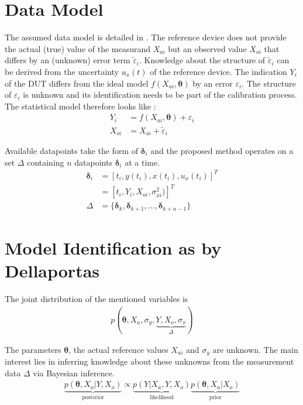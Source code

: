 \documentclass[10pt]{article}
\renewcommand{\vec}[1]{\boldsymbol{#1}}
\begin{document}
    \section{Data Model}
    The assumed data model is detailed in \cite{dellaportas_1995}.
    The reference device does not provide the actual (true) value of the measurand $X_{ai}$ but an observed value $X_{oi}$ that differs by an (unknown) error term $\tilde{\varepsilon}_i$.
    Knowledge about the structure of $\tilde{\varepsilon}_i$ can be derived from the uncertainty $u_x(t)$ of the reference device.
    The indication $Y_i$ of the DUT differs from the ideal model $f(X_{ai}, \vec{\theta})$ by an error $\varepsilon_i$.
    The structure of $\varepsilon_i$ is unknown and its identification needs to be part of the calibration process.
    The statistical model therefore looks like \cite{dellaportas_1995}:
    \begin{align}
        Y_i &= f(X_{ai}, \vec{\theta}) + \varepsilon_i \\
        X_{oi} &= X_{ai} + \tilde{\varepsilon}_i
    \end{align}
    
    Available datapoints take the form of $\vec{\delta}_i$ and the proposed method operates on a set $\Delta$ containing $n$ datapoints $\vec{\delta}_i$ at a time.
    \begin{align}
        \vec{\delta}_i &= [t_i, y(t_i), x(t_i), u_x(t_i)]^T \nonumber \\
                     &= [t_i, Y_i, X_{oi}, \sigma_{xi}^2)]^T \\
        \Delta &= \{\vec{\delta}_k, \vec{\delta}_{k+1}, \dots,  \vec{\delta}_{k+n-1}\} 
    \end{align}
    
    
    \section{Model Identification as by Dellaportas}
    The joint distribution of the mentioned variables is
    \begin{align}
        p(\vec{\theta}, X_a, \sigma_y, \underbrace{Y, X_o, \sigma_x}_{\Delta})
    \end{align}
    
    The parameters $\vec{\theta}$, the actual reference values $X_{ai}$ and $\sigma_{y}$ are unknown.
    The main interest lies in inferring knowledge about these unknowns from the measurement data $\Delta$ via Bayesian inference.
    \begin{align}
        \underbrace{p(\vec{\theta}, X_a | Y, X_o)}_{\text{posterior}} \propto \underbrace{p(Y | X_a, Y, X_o)}_{\text{likelihood}} \underbrace{p(\vec{\theta}, X_a | X_o)}_{\text{prior}}
    \end{align}
    
\end{document}
